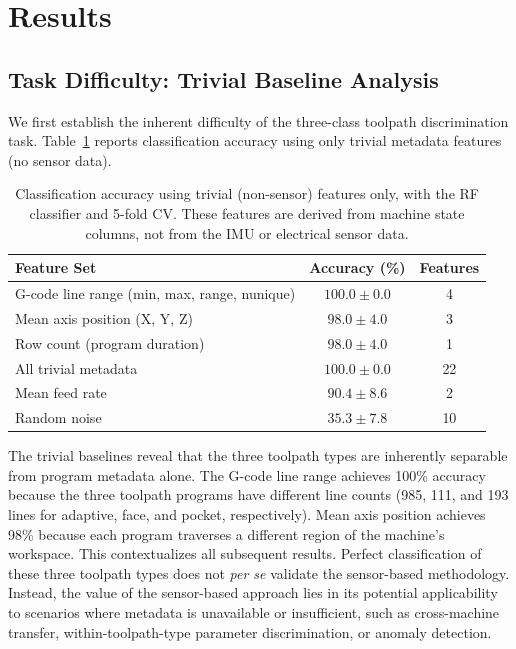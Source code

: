 \section{Results}\label{sec:results}

\subsection{Task Difficulty: Trivial Baseline Analysis}

We first establish the inherent difficulty of the three-class toolpath discrimination task. Table~\ref{tab:trivial_baselines} reports classification accuracy using only trivial metadata features (no sensor data).

\begin{table}[H]
\caption{Classification accuracy using trivial (non-sensor) features only, with the RF classifier and 5-fold CV. These features are derived from machine state columns, not from the IMU or electrical sensor data.}\label{tab:trivial_baselines}
\centering
\begin{tabular}{lcc}
\toprule
\textbf{Feature Set} & \textbf{Accuracy (\%)} & \textbf{Features} \\
\midrule
G-code line range (min, max, range, nunique)  & $100.0 \pm 0.0$ & 4 \\
Mean axis position (X, Y, Z)                  & $98.0 \pm 4.0$  & 3 \\
Row count (program duration)                  & $98.0 \pm 4.0$  & 1 \\
All trivial metadata                          & $100.0 \pm 0.0$ & 22 \\
Mean feed rate                                & $90.4 \pm 8.6$  & 2 \\
Random noise                                  & $35.3 \pm 7.8$  & 10 \\
\bottomrule
\end{tabular}
\end{table}

The trivial baselines reveal that the three toolpath types are inherently separable from program metadata alone. The G-code line range achieves 100\% accuracy because the three toolpath programs have different line counts (985, 111, and 193 lines for adaptive, face, and pocket, respectively). Mean axis position achieves 98\% because each program traverses a different region of the machine's workspace. This contextualizes all subsequent results. Perfect classification of these three toolpath types does not \textit{per se} validate the sensor-based methodology. Instead, the value of the sensor-based approach lies in its potential applicability to scenarios where metadata is unavailable or insufficient, such as cross-machine transfer, within-toolpath-type parameter discrimination, or anomaly detection.

